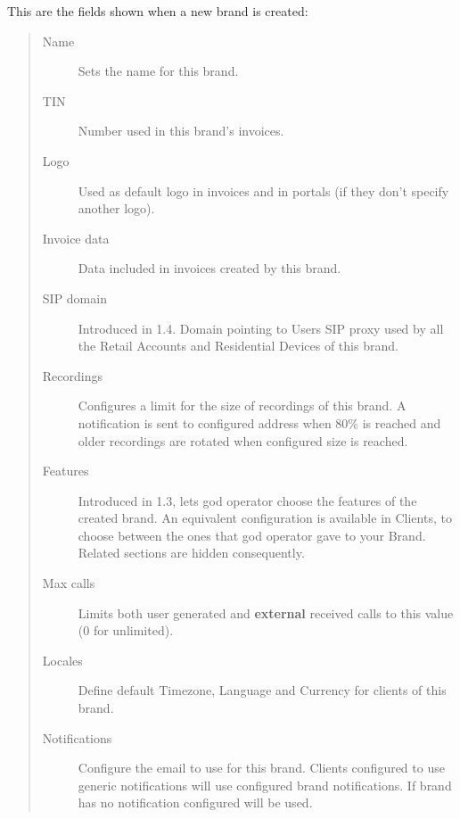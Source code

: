 \documentclass[letterpaper,10pt,spanish]{sphinxmanual}
\begin{document}
This are the fields shown when a new brand is created:
\begin{quote}
\begin{description}
\item[{Name}] \leavevmode
Sets the name for this brand.

\item[{TIN}] \leavevmode
Number used in this brand's invoices.

\item[{Logo}] \leavevmode
Used as default logo in invoices and in portals (if they don't specify
another logo).

\item[{Invoice data}] \leavevmode
Data included in invoices created by this brand.

\item[{SIP domain}] \leavevmode
Introduced in 1.4. Domain pointing to Users SIP proxy used by all the
Retail Accounts and Residential Devices of this brand.

\item[{Recordings}] \leavevmode
Configures a limit for the size of recordings of this brand. A
notification is sent to configured address when 80\% is reached and
older recordings are rotated when configured size is reached.

\item[{Features}] \leavevmode
Introduced in 1.3, lets god operator choose the features of the created
brand. An equivalent configuration is available in Clients, to choose
between the ones that god operator gave to your Brand. Related sections
are hidden consequently.

\item[{Max calls}] \leavevmode
Limits both user generated and \textbf{external} received calls to this value
(0 for unlimited).

\item[{Locales}] \leavevmode
Define default Timezone, Language and Currency for clients of this brand.

\item[{Notifications}] \leavevmode
Configure the email {\hyperref[administration_portal/brand/settings/notification_templates:id1]{}} to use for this brand.
Clients configured to use generic notifications will use configured
brand notifications. If brand has no notification configured
{\hyperref[administration_portal/platform/default_notification_templates:id1]{}} will be used.


\end{description}
\end{quote}
\end{document}
